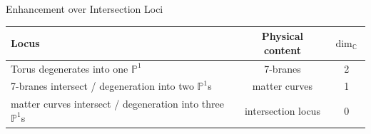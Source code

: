 \documentclass[notes=hide]{beamer}
\newcommand{\C}{\mathbb{C}}
\begin{document}
\begin{frame}{Enhancement over Intersection Loci}
\vspace{1em}
\begin{center}
\begin{tabular}{p{5cm} | c | c}
Locus & Physical content & $\dim_\C$\\
\toprule
Torus degenerates into one $\mathbb{P}^1$ & 7-branes & 2\\
\midrule
7-branes intersect / \newline degeneration into two $\mathbb{P}^1$s & matter curves & 1\\
\midrule
matter curves intersect / \newline degeneration into three $\mathbb{P}^1$s  & intersection locus & 0\\
\bottomrule
\end{tabular}
\end{center}
\hfill
\pause
\huge
\textcolor{green}{}
\end{frame}
\end{document}
